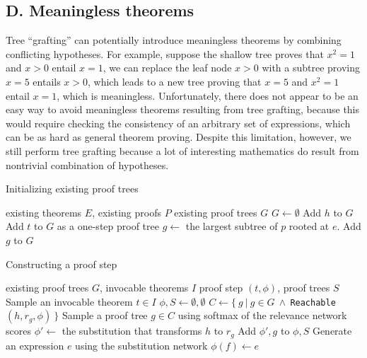 \documentclass{article}
\begin{document}
\subsection*{D. Meaningless theorems}
Tree ``grafting'' can potentially introduce meaningless theorems by combining conflicting hypotheses. 
For example, 
suppose the shallow tree proves that $x^2=1$ and $x>0$ entail $x=1$, we can replace the leaf node $x>0$ with a subtree proving $x=5$ entails $x>0$, which leads to a new tree proving that $x=5$ and $x^2=1$ entail $x=1$, which is meaningless. Unfortunately, there does not appear to be an easy way to avoid meaningless theorems resulting from tree grafting, because this would require checking the consistency of an arbitrary set of expressions, which can be as hard as general theorem proving. Despite this limitation, however, we still perform tree grafting because a lot of interesting mathematics do result from nontrivial combination of hypotheses. 

\begin{algorithm}[t]
   \caption{Initializing existing proof trees}
   \label{algo:initial}
\begin{algorithmic}
 existing theorems $E$, existing proofs $P$
 existing proof trees $G$
    \STATE $G\leftarrow\emptyset$
            \STATE Add $h$ to $G$
        \ENDFOR
        \STATE Add $t$ to $G$ as a one-step proof tree
    \ENDFOR
            \STATE $g\leftarrow$ the largest subtree of $p$ rooted at $e$. 
            \STATE Add $g$ to $G$
        \ENDFOR
    \ENDFOR
\end{algorithmic}
\end{algorithm}

\begin{algorithm}[!ht]
   \caption{Constructing a proof step}
   \label{algo:step}
\begin{algorithmic}
 existing proof trees $G$, invocable theorems $I$
 proof step $(t,\phi)$, proof trees $S$
    \STATE Sample an invocable theorem $t\in I$
    \STATE $\phi,S\leftarrow \emptyset,\emptyset$
        \STATE $C\leftarrow\{\:g\:|\:g\in G\: \land\:$\texttt{Reachable}$(h,r_g, \phi)\:\}$
        \STATE{}
        \STATE Sample a proof tree $g\in C$ using softmax of the relevance network scores
        \STATE $\phi'\leftarrow$ the substitution that transforms $h$ to $r_g$
        \STATE Add $\phi', g$ to $\phi, S$
    \ENDFOR
            \STATE Generate an expression $e$ using the substitution network
            \STATE $\phi(f)\leftarrow e$
        \ENDIF
    \ENDFOR
\end{algorithmic}
\end{algorithm}
\end{document}

